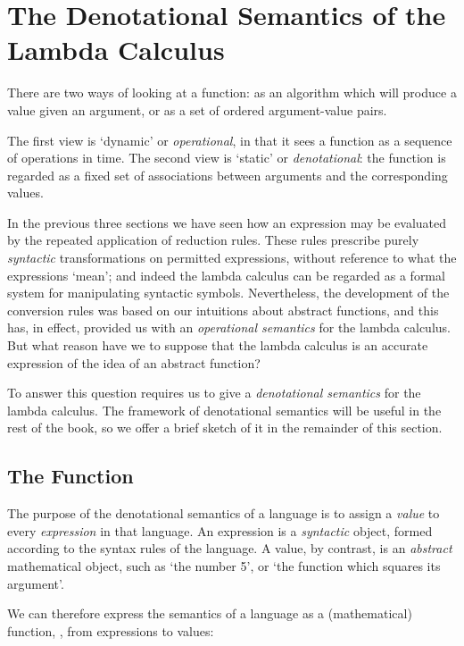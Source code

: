 \section{The Denotational Semantics of the Lambda Calculus}

There are two ways of looking at a function: as an algorithm which will
produce a value given an argument, or as a set of ordered argument-value
pairs.

The first view is `dynamic' or \textit{operational}, in that it sees a function as a
sequence of operations in time. The second view is `static' or \textit{denotational}: the
function is regarded as a fixed set of associations between arguments and the
corresponding values.

In the previous three sections we have seen how an expression may be
evaluated by the repeated application of reduction rules. These rules
prescribe purely \textit{syntactic} transformations on permitted expressions, without
reference to what the expressions `mean'; and indeed the lambda calculus can
be regarded as a formal system for manipulating syntactic symbols. Nevertheless, the development of the conversion rules was based on our intuitions about abstract functions, and this has, in effect, provided us with an
\textit{operational semantics} for the lambda calculus. But what reason have we to
suppose that the lambda calculus is an accurate expression of the idea of an
abstract function?

To answer this question requires us to give a \textit{denotational semantics} for the
lambda calculus. The framework of denotational semantics will be useful in
the rest of the book, so we offer a brief sketch of it in the remainder of this
section.

\subsection{The \eval{} Function}

The purpose of the denotational semantics of a language is to assign a \textit{value} to
every \textit{expression} in that language. An expression is a \textit{syntactic} object, formed
according to the syntax rules of the language. A value, by contrast, is an
\textit{abstract} mathematical object, such as `the number 5', or `the function which
squares its argument'.

We can therefore express the semantics of a language as a (mathematical)
function, \eval{}, from expressions to values:

